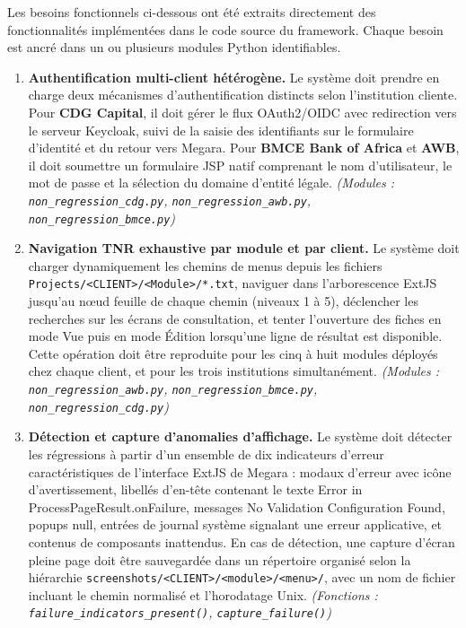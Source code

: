 \documentclass[12pt, a4paper]{report}
\begin{document}
Les besoins fonctionnels ci-dessous ont été extraits directement des fonctionnalités implémentées dans le code source du framework. Chaque besoin est ancré dans un ou plusieurs modules Python identifiables.

\begin{enumerate}[label=\textbf{BF\arabic*.}, leftmargin=*, itemsep=6pt]

  \item \textbf{Authentification multi-client hétérogène.}
  Le système doit prendre en charge deux mécanismes d'authentification distincts selon l'institution cliente. Pour \textbf{CDG Capital}, il doit gérer le flux OAuth2/OIDC avec redirection vers le serveur Keycloak, suivi de la saisie des identifiants sur le formulaire d'identité et du retour vers Megara. Pour \textbf{BMCE Bank of Africa} et \textbf{AWB}, il doit soumettre un formulaire JSP natif comprenant le nom d'utilisateur, le mot de passe et la sélection du domaine d'entité légale.
  \textit{(Modules : \texttt{non\_regression\_cdg.py}, \texttt{non\_regression\_awb.py}, \texttt{non\_regression\_bmce.py})}

  \item \textbf{Navigation TNR exhaustive par module et par client.}
  Le système doit charger dynamiquement les chemins de menus depuis les fichiers \texttt{Projects/<CLIENT>/<Module>/*.txt}, naviguer dans l'arborescence ExtJS jusqu'au nœud feuille de chaque chemin (niveaux 1 à 5), déclencher les recherches sur les écrans de consultation, et tenter l'ouverture des fiches en mode Vue puis en mode Édition lorsqu'une ligne de résultat est disponible. Cette opération doit être reproduite pour les cinq à huit modules déployés chez chaque client, et pour les trois institutions simultanément.
  \textit{(Modules : \texttt{non\_regression\_awb.py}, \texttt{non\_regression\_bmce.py}, \texttt{non\_regression\_cdg.py})}

  \item \textbf{Détection et capture d'anomalies d'affichage.}
  Le système doit détecter les régressions à partir d'un ensemble de dix indicateurs d'erreur caractéristiques de l'interface ExtJS de Megara : modaux d'erreur avec icône d'avertissement, libellés d'en-tête contenant le texte \og{}Error in ProcessPageResult.onFailure\fg{}, messages \og{}No Validation Configuration Found\fg{}, popups \og{}null\fg{}, entrées de journal système signalant une erreur applicative, et contenus de composants inattendus. En cas de détection, une capture d'écran pleine page doit être sauvegardée dans un répertoire organisé selon la hiérarchie \nolinkurl{screenshots/<CLIENT>/<module>/<menu>/}, avec un nom de fichier incluant le chemin normalisé et l'horodatage Unix.
  \textit{(Fonctions : \texttt{failure\_indicators\_present()}, \texttt{capture\_failure()})}


\end{enumerate}
\end{document}
